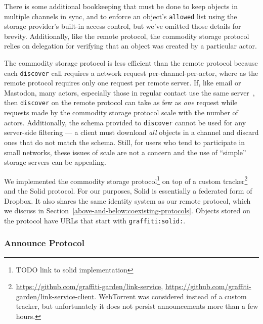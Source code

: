 There is some additional bookkeeping that must be done to
keep objects in multiple channels in sync, and to enforce an object's
\texttt{allowed} list using the storage provider's built-in access control,
but we've omitted those details for brevity.
Additionally, like the remote protocol, the commodity storage protocol
relies on delegation for verifying that an object was created by a particular actor.

The commodity storage protocol is less efficient than the remote protocol because each
\texttt{discover} call requires a network request per-channel-per-actor,
where as the remote protocol requires only one request per remote server.
If, like email or Mastodon, many actors, especially those in regular contact
use the same server~\cite{mastodonchallenges},
then \texttt{discover} on the remote protocol can take as
few as \emph{one} request while requests made by
the commodity storage protocol scale with the number of actors.
Additionally, the schema provided to \texttt{discover} cannot be used for any
server-side filtering --- a client must download \emph{all} objects in a channel
and discard ones that do not match the schema.
Still, for users who tend to participate in small networks, these issues
of scale are not a concern and the use of ``simple'' storage servers can be appealing.

We implemented the commodity storage protocol\footnote{
    TODO link to solid implementation
} on top of a custom tracker\footnote{
    \url{https://github.com/graffiti-garden/link-service},
    \url{https://github.com/graffiti-garden/link-service-client}.
    WebTorrent was considered instead of a custom tracker,
    but unfortunately it does not persist announcements more than a few hours.
} and the Solid protocol.
For our purposes, Solid is essentially a federated form of Dropbox.
It also shares the same identity system as our remote protocol,
which we discuss in Section~\ref{above-and-below:coexisting-protocols}.
Objects stored on the protocol have URLs that start with \texttt{graffiti:solid:}.

\subsubsection{Announce Protocol}
\label{above-and-below:announce-protocol}

